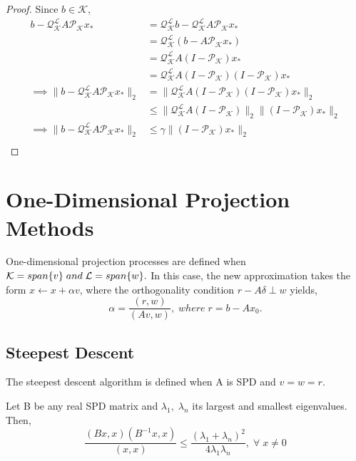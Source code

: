 \documentclass[10pt,a4paper]{article}
\begin{document}
\begin{proof}
Since $b\in\mathcal{K},$
\begin{align*}
b-\mathcal{Q}^\mathcal{L}_\mathcal{K}A\mathcal{P}_\mathcal{K}x_*&=\mathcal{Q}^\mathcal{L}_\mathcal{K}b-\mathcal{Q}^\mathcal{L}_\mathcal{K}A\mathcal{P}_\mathcal{K}x_* \\
&=\mathcal{Q}^\mathcal{L}_\mathcal{K}(b-A\mathcal{P}_\mathcal{K}x_*) \\
&=\mathcal{Q}^\mathcal{L}_\mathcal{K}A(I-\mathcal{P}_\mathcal{K})x_* \\
&=\mathcal{Q}^\mathcal{L}_\mathcal{K}A(I-\mathcal{P}_\mathcal{K})(I-\mathcal{P}_\mathcal{K})x_* \\
\implies \|b-\mathcal{Q}^\mathcal{L}_\mathcal{K}A\mathcal{P}_\mathcal{K}x_*\|_2 &= \|\mathcal{Q}^\mathcal{L}_\mathcal{K}A(I-\mathcal{P}_\mathcal{K})(I-\mathcal{P}_\mathcal{K})x_*\|_2 \\
&\le \|\mathcal{Q}^\mathcal{L}_\mathcal{K}A(I-\mathcal{P}_\mathcal{K})\|_2\|(I-\mathcal{P}_\mathcal{K})x_*\|_2 \\
\implies \|b-\mathcal{Q}^\mathcal{L}_\mathcal{K}A\mathcal{P}_\mathcal{K}x_*\|_2 &\le \gamma\|(I-\mathcal{P}_\mathcal{K})x_*\|_2 \\
\end{align*}
\end{proof}

\section{One-Dimensional Projection Methods}

One-dimensional projection processes are defined when $\mathcal{K}=span\{v\}\;and\\\;\mathcal{L}=span\{w\}.$ In this case, the new approximation  takes the form $x\leftarrow x+\alpha v$, where the orthogonality condition $r-A\delta\perp w$ yields,
$$\alpha = \frac{(r,w)}{(Av,w)},\;where\;r=b-Ax_0.$$

\subsection{Steepest Descent}

The steepest descent algorithm is defined when A is SPD and $v=w=r.$ 

\begin{lemma}
Let B be any real SPD matrix and $\lambda_1,\;\lambda_n$ its largest and smallest eigenvalues. Then,
$$\frac{(Bx,x)(B^{-1}x,x)}{(x,x)}\le\frac{(\lambda_1+\lambda_n)^2}{4\lambda_1\lambda_n},\;\forall\;x\neq 0$$
\end{lemma}
\end{document}
